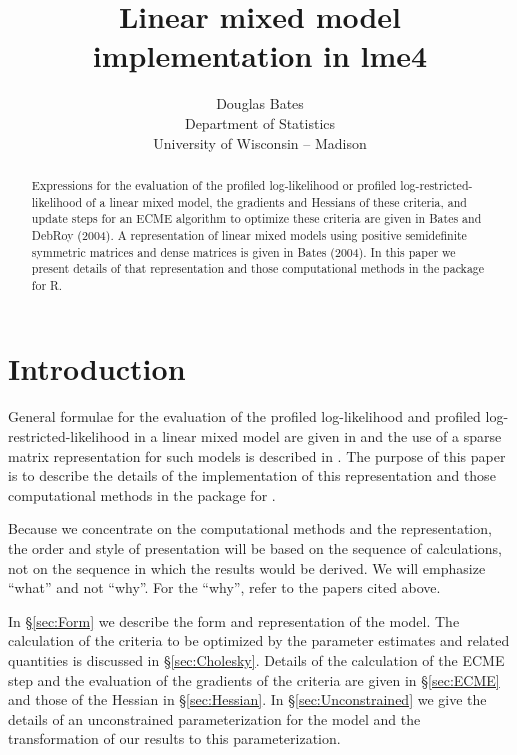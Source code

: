 \documentclass[12pt]{article}
\begin{document}
\title{Linear mixed model implementation in lme4}
\author{Douglas Bates\\Department of Statistics\\University of
  Wisconsin -- Madison\\}
\maketitle
\begin{abstract}
  Expressions for the evaluation of the profiled log-likelihood or
  profiled log-restricted-likelihood of a linear mixed model, the
  gradients and Hessians of these criteria, and update steps for an
  ECME algorithm to optimize these criteria are given in Bates and
  DebRoy (2004).  A representation of linear mixed models using
  positive semidefinite symmetric matrices and dense matrices is given
  in Bates (2004).  In this paper we present details of that
  representation and those computational methods in the 
  package for R.
\end{abstract}

\section{Introduction}
\label{sec:Intro}

General formulae for the evaluation of the profiled log-likelihood and
profiled log-restricted-likelihood in a linear mixed model are given
in \citet{bate:debr:2004} and the use of a sparse matrix
representation for such models is described in \citet{bate:2004}.  The
purpose of this paper is to describe the details of the implementation
of this representation and those computational methods in the 
package for \RR{}.

Because we concentrate on the computational methods and the
representation, the order and style of presentation will be based on
the sequence of calculations, not on the sequence in which the results
would be derived.  We will emphasize ``what'' and not ``why''.  For
the ``why'', refer to the papers cited above.

In \S\ref{sec:Form} we describe the form and representation of the
model.  The calculation of the criteria to be optimized by the
parameter estimates and related quantities is discussed in
\S\ref{sec:Cholesky}.  Details of the calculation of the ECME step and the
evaluation of the gradients of the criteria are given in
\S\ref{sec:ECME} and those of the Hessian in \S\ref{sec:Hessian}.  In
\S\ref{sec:Unconstrained} we give the details of an unconstrained
parameterization for the model and the transformation of our
results to this parameterization.
\end{document}

